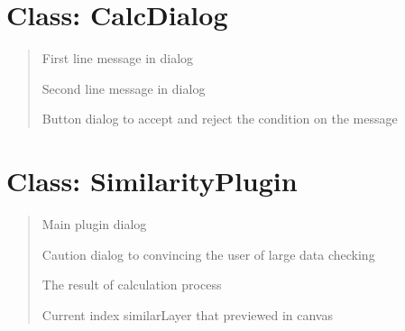 \documentclass[letterpaper,10pt,english]{sphinxmanual}
\begin{document}
\section{Class: CalcDialog}
\label{\detokenize{dialog_classes:class-calcdialog}}\begin{quote}


\begin{fulllineitems}
First line message in dialog

\end{fulllineitems}



\begin{fulllineitems}
Second line message in dialog

\end{fulllineitems}



\begin{fulllineitems}
Button dialog to accept and reject the condition on the message

\end{fulllineitems}

\end{quote}


\section{Class: SimilarityPlugin}
\label{\detokenize{dialog_classes:class-similarityplugin}}\begin{quote}


\begin{fulllineitems}
Main plugin dialog

\end{fulllineitems}



\begin{fulllineitems}
Caution dialog to convincing the user of large data checking

\end{fulllineitems}



\begin{fulllineitems}
The result of calculation process

\end{fulllineitems}



\begin{fulllineitems}
Current index similarLayer that previewed in canvas

\end{fulllineitems}

\end{quote}
\end{document}
